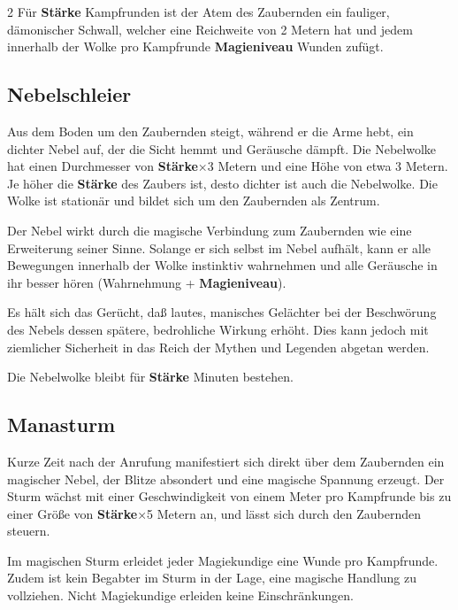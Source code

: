 \begin{multicols*}{2}
Für \textbf{Stärke} Kampfrunden ist der Atem des Zaubernden ein fauliger, dämonischer Schwall, welcher eine Reichweite von 2 Metern hat und jedem innerhalb der Wolke pro Kampfrunde \textbf{Magieniveau} Wunden zufügt.



\subsection{Nebelschleier}

Aus dem Boden um den Zaubernden steigt, während er die Arme hebt, ein dichter Nebel auf, der die Sicht hemmt und Geräusche dämpft. Die Nebelwolke hat einen Durchmesser von \textbf{Stärke}×3 Metern und eine Höhe von etwa 3 Metern. Je höher die \textbf{Stärke} des Zaubers ist, desto dichter ist auch die Nebelwolke. Die Wolke ist stationär und bildet sich um den Zaubernden als Zentrum.

Der Nebel wirkt durch die magische Verbindung zum Zaubernden wie eine Erweiterung seiner Sinne. Solange er sich selbst im Nebel aufhält, kann er alle Bewegungen innerhalb der Wolke instinktiv wahrnehmen und alle Geräusche in ihr besser hören (Wahrnehmung + \textbf{Magieniveau}).

Es hält sich das Gerücht, daß lautes, manisches Gelächter bei der Beschwörung des Nebels dessen spätere, bedrohliche Wirkung erhöht. Dies kann jedoch mit ziemlicher Sicherheit in das Reich der Mythen und Legenden abgetan werden.

Die Nebelwolke bleibt für \textbf{Stärke} Minuten bestehen.



\subsection{Manasturm}

Kurze Zeit nach der Anrufung manifestiert sich direkt über dem Zaubernden ein magischer Nebel, der Blitze absondert und eine magische Spannung erzeugt. Der Sturm wächst mit einer Geschwindigkeit von einem Meter pro Kampfrunde bis zu einer Größe von \textbf{Stärke}×5 Metern an, und lässt sich durch den Zaubernden steuern.

Im magischen Sturm erleidet jeder Magiekundige eine Wunde pro Kampfrunde. Zudem ist kein Begabter im Sturm in der Lage, eine magische Handlung zu vollziehen. Nicht Magiekundige erleiden keine Einschränkungen.


\end{multicols*}
